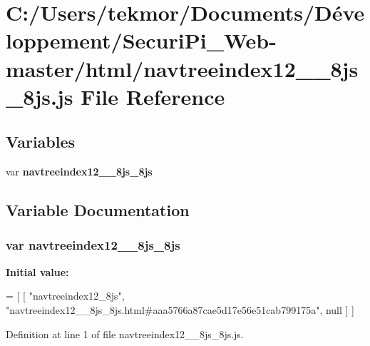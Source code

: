 \section{C\+:/\+Users/tekmor/\+Documents/\+Développement/\+Securi\+Pi\+\_\+\+Web-\/master/html/navtreeindex12\+\_\+\+\_\+8js\+\_\+8js.js File Reference}
\label{navtreeindex12____8js__8js_8js}
\subsection*{Variables}
\begin{DoxyCompactItemize}
\item 
var {\bf navtreeindex12\+\_\+\+\_\+8js\+\_\+8js}
\end{DoxyCompactItemize}


\subsection{Variable Documentation}
\subsubsection[{navtreeindex12\+\_\+\+\_\+8js\+\_\+8js}]{\setlength{\rightskip}{0pt plus 5cm}var navtreeindex12\+\_\+\+\_\+8js\+\_\+8js}\label{navtreeindex12____8js__8js_8js_a2bc109638de1b628715bc54a50a53fcb}
{\bfseries Initial value\+:}
\begin{DoxyCode}
=
[
    [ \textcolor{stringliteral}{"navtreeindex12\_8js"}, \textcolor{stringliteral}{"navtreeindex12\_\_8js\_8js.html#aaa5766a87cae5d17e56e51cab799175a"}, null ]
]
\end{DoxyCode}


Definition at line 1 of file navtreeindex12\+\_\+\+\_\+8js\+\_\+8js.\+js.

